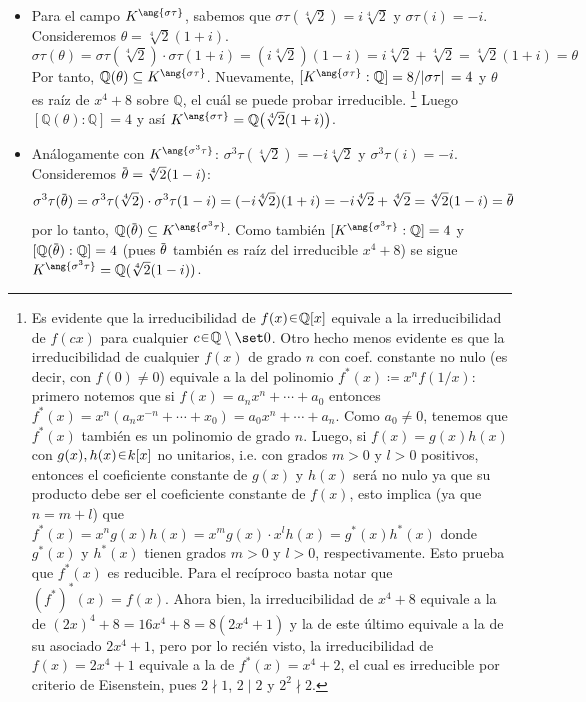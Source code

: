 \begin{sol}
\begin{enumerate}[label=\alph*)]
\begin{itemize}
    \item 
    Para el campo $K^{\ang{\sigma\tau}}$, sabemos que $\sigma\tau(\sqrt[4]{2}) = i\sqrt[4]{2}$ y $\sigma\tau(i) = -i$. Consideremos $\theta = \sqrt[4]{2}(1+i)$.
    \[
    \sigma\tau(\theta) = \sigma\tau(\sqrt[4]{2}) \cdot \sigma\tau(1+i) = (i\sqrt[4]{2})(1 - i) = i\sqrt[4]{2} + \sqrt[4]{2} = \sqrt[4]{2}(1+i) = \theta
    \]
    Por tanto, $\mathbb{Q}(\theta) \subseteq K^{\ang{\sigma\tau}}$. Nuevamente, $[K^{\ang{\sigma\tau}}:\mathbb{Q}] = 8/\abs*{\sigma\tau} = 4$ y $\theta$ es raíz de $x^4+8$ sobre $\mathbb{Q}$, el cuál se puede probar irreducible.%
    \footnote{
        Es evidente que la irreducibilidad de $f(x)\en \mathbb{Q}[x]$ equivale a la irreducibilidad de $f(cx)$ para cualquier $c\en \mathbb{Q}\setminus\set0$. Otro hecho menos evidente es que la irreducibilidad de cualquier $f(x)$ de grado $n$ con coef. constante no nulo (es decir, con $f(0)\neq 0$) equivale a la del polinomio $f^*(x) \coloneq x^nf(1/x)$: primero notemos que si $f(x) = a_nx^n+\cdots + a_0$ entonces $f^*(x) = x^n(a_nx^{-n}+\cdots+x_0) = a_0x^n+\cdots+a_n$. Como $a_0 \neq 0$, tenemos que $f^*(x)$ también es un polinomio de grado $n$. Luego, si $f(x) = g(x)h(x)$ con $g(x),h(x) \en k[x]$ no unitarios, i.e. con grados $m>0$ y $l>0$ positivos, entonces el coeficiente constante de $g(x)$ y $h(x)$ será no nulo ya que su producto debe ser el coeficiente constante de $f(x)$, esto implica (ya que $n = m+l$) que $f^*(x) = x^ng(x)h(x) = x^mg(x) \cdot x^lh(x) = g^*(x)h^*(x)$ donde $g^*(x)$ y $h^*(x)$ tienen grados $m>0$ y $l>0$, respectivamente. Esto prueba que $f^*(x)$ es reducible. Para el recíproco basta notar que $(f^*)^*(x) = f(x)$. Ahora bien, la irreducibilidad de $x^4+8$ equivale a la de $(2x)^4+8 = 16x^4+8 = 8(2x^4+1)$ y la de este último equivale a la de su asociado $2x^4+1$, pero por lo recién visto, la irreducibilidad de $f(x)=2x^4+1$ equivale a la de $f^*(x)=x^4+2$, el cual es irreducible por criterio de Eisenstein, pues $2 \nmid 1$, $2\mid 2$ y $2^2 \nmid 2$.
    }
    Luego $[\mathbb{Q}(\theta):\mathbb{Q}] = 4$ y así $K^{\ang{\sigma\tau}} = \mathbb{Q}\big(\sqrt[4]{2}(1+i)\big)$.

    \item 
    Análogamente con $K^{\ang{\sigma^3\tau}}$: $\sigma^3\tau(\sqrt[4]{2}) = -i\sqrt[4]{2}$ y $\sigma^3\tau(i) = -i$. Consideremos $\ubar{\theta} = \sqrt[4]{2}(1-i)$:
    \[
    \sigma^3\tau(\ubar{\theta}) = \sigma^3\tau(\sqrt[4]{2}) \cdot \sigma^3\tau(1-i) = (-i\sqrt[4]{2})(1 + i) = -i\sqrt[4]{2} + \sqrt[4]{2} = \sqrt[4]{2}(1-i) = \ubar{\theta}
    \]
    por lo tanto, $\mathbb{Q}(\ubar\theta) \subseteq K^{\ang{\sigma^3\tau}}$. Como también $\brack{K^{\ang{\sigma^3\tau}} : \mathbb{Q}} = 4$ y $\brack{\mathbb{Q}(\ubar\theta):\mathbb{Q}}=4$ (pues $\ubar\theta$ también es raíz del irreducible $x^4+8$) se sigue $K^{\ang{\sigma^3\tau}} = \mathbb{Q}(\sqrt[4]{2}(1-i))$.


\end{itemize}
\end{enumerate}
\end{sol}
